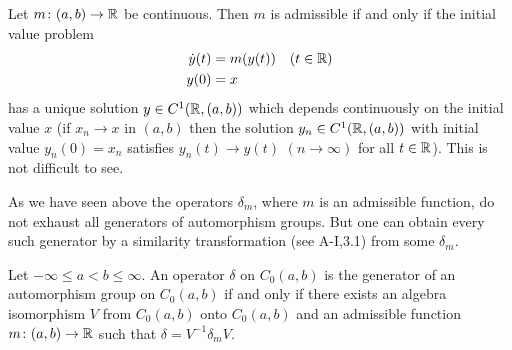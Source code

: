 \begin{remark*}\label{rem:b2-3.24}
%
Let $m \colon (a,b) \to \mathbb{R}$ be continuous.
Then $m$ is admissible if and only if the initial value problem
\begin{align*}
\dot{y}(t) &= m(y(t)) \quad (t \in \mathbb{R}) \\
y(0) &= x
\end{align*}
has a unique solution $y \in C^{1}(\mathbb{R},(a,b))$ which depends continuously on the initial value $x$ (\ie  if $x_{n} \to x$ in $(a,b)$ then the solution $y_{n} \in C^{1}(\mathbb{R},(a,b))$ with initial value $y_{n}(0) = x_{n}$ satisfies $y_{n}(t) \to y(t)$ $(n \to \infty)$ for all $t \in \mathbb{R}$).
This is not difficult to see.
\end{remark*}
As we have seen above the operators $\delta_{m}$, where $m$ is an admissible function, do not exhaust all generators of automorphism groups.
But one can obtain every such generator by a similarity transformation (see A-I,3.1) from some $\delta_{m}$.
\begin{theorem}\label{thm:b2-3.24}
%
Let $-\infty \leq a < b \leq \infty$.
An operator $\delta$ on $C_{0}(a,b)$ is the generator of an automorphism group on $C_{0}(a,b)$ if and only if there exists an algebra isomorphism $V$ from $C_{0}(a,b)$ onto $C_{0}(a,b)$ and an admissible function $m \colon (a,b) \to \mathbb{R}$ such that $\delta = V^{-1}\delta_{m}V$.
\end{theorem}
